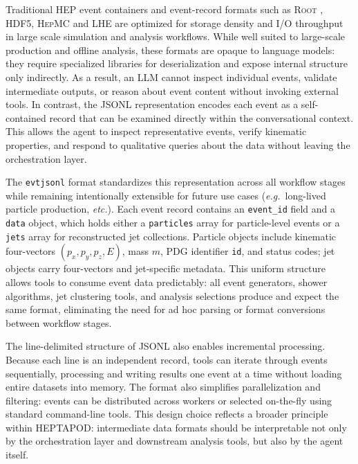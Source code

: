\documentclass[11pt,oneside]{article}
\numberwithin{equation}{section}
\newcommand{\pkgname}{HEPTAPOD\xspace}
\begin{document}
Traditional HEP event containers and event-record formats such as \textsc{Root} \cite{Antcheva:2009zz}, \textsc{HDF5}, \textsc{HepMC} \cite{Buckley:2019xhk} and \textsc{LHE} \cite{Alwall:2006yp} are optimized for storage density and I/O throughput in large scale simulation and analysis workflows.
While well suited to large-scale production and offline analysis, these formats are opaque to language models: they require specialized libraries for deserialization and expose internal structure only indirectly.
As a result, an LLM cannot inspect individual events, validate intermediate outputs, or reason about event content without invoking external tools.
In contrast, the JSONL representation encodes each event as a self-contained record that can be examined directly within the conversational context.
This allows the agent to inspect representative events, verify kinematic properties, and respond to qualitative queries about the data without leaving the orchestration layer.

The \texttt{evtjsonl} format standardizes this representation across all workflow stages while remaining intentionally extensible for future use cases (\textit{e.g.}~long-lived particle production, \textit{etc.}).
Each event record contains an \texttt{event\_id} field and a \texttt{data} object, which holds either a \texttt{particles} array for particle-level events or a \texttt{jets} array for reconstructed jet collections.
Particle objects include kinematic four-vectors $(p_x, p_y, p_z, E)$, mass $m$, PDG identifier \texttt{id}, and status codes; jet objects carry four-vectors and jet-specific metadata.
This uniform structure allows tools to consume event data predictably: all event generators, shower algorithms, jet clustering tools, and analysis selections produce and expect the same format, eliminating the need for ad hoc parsing or format conversions between workflow stages.

The line-delimited structure of JSONL also enables incremental processing.
Because each line is an independent record, tools can iterate through events sequentially, processing and writing results one event at a time without loading entire datasets into memory.
The format also simplifies parallelization and filtering: events can be distributed across workers or selected on-the-fly using standard command-line tools.
This design choice reflects a broader principle within \pkgname: intermediate data formats should be interpretable not only by the orchestration layer and downstream analysis tools, but also by the agent itself.
\end{document}
